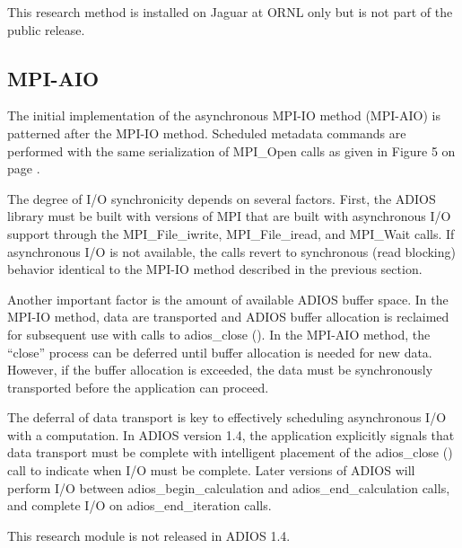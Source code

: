 This research method is installed on Jaguar at ORNL only but is not part of the 
public release.\label{HToc182553395}

\subsection{MPI-AIO}

The initial implementation of the asynchronous MPI-IO method (MPI-AIO) is patterned 
after the MPI-IO method. Scheduled metadata commands are performed with the same 
serialization of MPI\_Open calls as given in Figure 5 on page \pageref{HRef140744843}.

The degree of I/O synchronicity depends on several factors. First, the ADIOS library 
must be built with versions of MPI that are built with asynchronous I/O support 
through the MPI\_File\_iwrite, MPI\_File\_iread, and MPI\_Wait calls. If asynchronous 
I/O is not available, the calls revert to synchronous (read blocking) behavior 
identical to the MPI-IO method described in the previous section. 

Another important factor is the amount of available ADIOS buffer space. In the 
MPI-IO method, data are transported and ADIOS buffer allocation is reclaimed for 
subsequent use with calls to adios\_close (). In the MPI-AIO method, the ``close'' 
process can be deferred until buffer allocation is needed for new data. However, 
if the buffer allocation is exceeded, the data must be synchronously transported 
before the application can proceed.

The deferral of data transport is key to effectively scheduling asynchronous I/O 
with a computation. In ADIOS version 1.4, the application explicitly signals that 
data transport must be complete with intelligent placement of the adios\_close 
() call to indicate when I/O must be complete. Later versions of ADIOS will perform 
I/O between adios\_begin\_calculation and adios\_end\_calculation calls, and complete 
I/O on adios\_end\_iteration calls.

This research module is not released in ADIOS 1.4.\label{HRef118286941}\label{HToc84890268}\label{HToc212016644}\label{HToc212016886}\label{HToc182553396}
